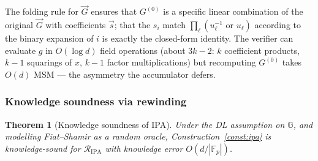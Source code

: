 \documentclass[11pt,a4paper]{article}
\newtheorem{theorem}{Theorem}[section]
\theoremstyle{definition}
\newcommand{\F}{\mathbb{F}}
\newcommand{\G}{\mathbb{G}}
\newcommand{\Rel}{\mathcal{R}}
\begin{document}
The folding rule for $\vec{G}$ ensures that $G^{(0)}$ is a specific
linear combination of the original $\vec{G}$ with coefficients $\vec{s}$;
that the $s_i$ match $\prod_\ell (u_\ell^{-1} \text{ or } u_\ell)$
according to the binary expansion of $i$ is exactly the closed-form
identity. The verifier can evaluate $g$ in $O(\log d)$ field operations
(about $3k-2$: $k$ coefficient products, $k-1$ squarings of $x$, $k-1$
factor multiplications) but recomputing $G^{(0)}$ takes $O(d)$ MSM ---
the asymmetry the accumulator defers.

\subsubsection{Knowledge soundness via rewinding}\label{sec:ipa-extract}

\begin{theorem}[Knowledge soundness of IPA]\label{thm:ipa-ks}
Under the DL assumption on $\G$, and modelling Fiat--Shamir as a random
oracle, Construction~\ref{const:ipa} is knowledge-sound for
$\Rel_{\mathrm{IPA}}$ with knowledge error $O(d / |\F_p|)$.
\end{theorem}
\end{document}
